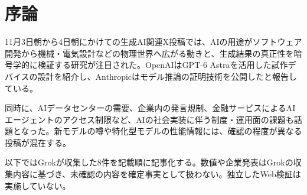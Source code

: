 \section*{序論}
11月3日朝から4日朝にかけての生成AI関連X投稿では、AIの用途がソフトウェア開発から機械・電気設計などの物理世界へ広がる動きと、生成結果の真正性を暗号学的に検証する研究が注目された。OpenAIはGPT-6 Astraを活用した試作デバイスの設計を紹介し、Anthropicはモデル推論の証明技術を公開したと報告している。

同時に、AIデータセンターの需要、企業内の発言規制、金融サービスによるAIエージェントのアクセス制限など、AIの社会実装に伴う制度・運用面の課題も話題となった。新モデルの噂や特化型モデルの性能情報には、確認の程度が異なる投稿が混在する。

以下ではGrokが収集した8件を記載順に記事化する。数値や企業発表はGrokの収集内容に基づき、未確認の内容を確定事実として扱わない。独立したWeb検証は実施していない。

